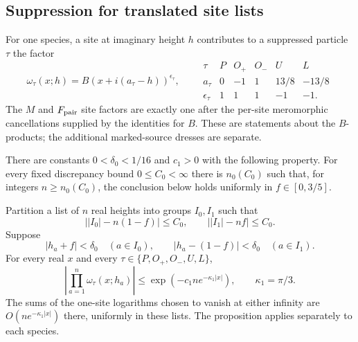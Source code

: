 \subsection{Suppression for translated site lists}

For one species, a site at imaginary height \(h\) contributes to a suppressed particle \(\tau\) the factor
\[
\omega_\tau(x;h)=B(x+i(a_\tau-h))^{\epsilon_\tau},
\qquad
\begin{array}{c|ccccc}
\tau&P&O_+&O_-&U&L\\\hline
a_\tau&0&-1&1&13/8&-13/8\\
\epsilon_\tau&1&1&1&-1&-1 .
\end{array}
\]
The \(M\) and \(F_{\rm pair}\) site factors are exactly one after the per-site meromorphic cancellations supplied by the identities for \(B\). These are statements about the \(B\)-products; the additional marked-source dresses are separate.

\begin{proposition}\label{j:shifted-suppression}
There are constants \(0<\delta_0<1/16\) and \(c_1>0\) with the following property. For every fixed discrepancy bound \(0\le C_0<\infty\) there is \(n_0(C_0)\) such that, for integers \(n\ge n_0(C_0)\), the conclusion below holds uniformly in \(f\in[0,3/5]\).

Partition a list of \(n\) real heights into groups \(I_0,I_1\) such that
\[
\bigl||I_0|-n(1-f)\bigr|\le C_0,\qquad
\bigl||I_1|-nf\bigr|\le C_0.
\]
Suppose
\[
|h_a+f|<\delta_0\quad(a\in I_0),\qquad
|h_a-(1-f)|<\delta_0\quad(a\in I_1).
\]
For every real \(x\) and every \(\tau\in\{P,O_+,O_-,U,L\}\),
\begin{equation}\label{j:shifted-suppression-bound}
\left|\prod_{a=1}^n\omega_\tau(x;h_a)\right|
\le \exp\!\left(-c_1 n e^{-\kappa_1|x|}\right),
\qquad \kappa_1=\pi/3.
\end{equation}
The sums of the one-site logarithms chosen to vanish at either infinity are \(O(n e^{-\kappa_1|x|})\) there, uniformly in these lists. The proposition applies separately to each species.
\end{proposition}

